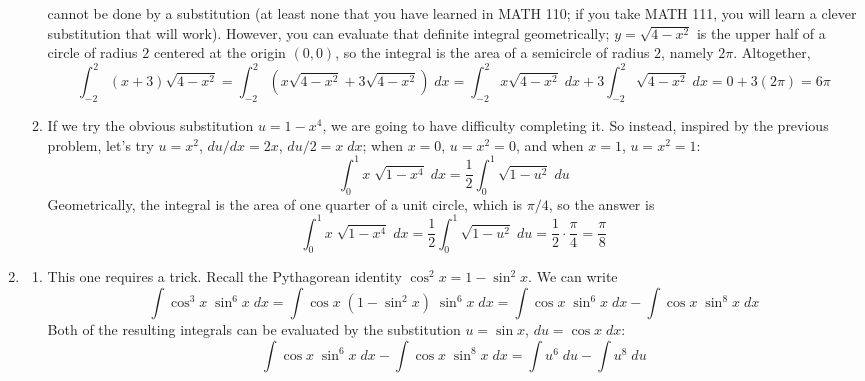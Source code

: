 \documentclass{article}
\begin{document}
\begin{enumerate}
\begin{enumerate}
\begin{equation*}
    \end{equation*}
    cannot be done by a substitution (at least none that you have
    learned in MATH 110; if you take MATH 111, you will learn a clever
    substitution that will work).  However, you can evaluate that
    definite integral geometrically; $y=\sqrt{4-x^2}$ is the upper
    half of a circle of radius $2$ centered at the origin $(0,0)$, so
    the integral is the area of a semicircle of radius $2$, namely
    $2\pi$.  %
    Altogether,
    \begin{equation*}
      \int_{-2}^2 (x+3) \sqrt{4-x^2}
      = \int_{-2}^2 \left( x\sqrt{4-x^2} + 3 \sqrt{4-x^2} \right) \;
      dx
      = \int_{-2}^2 x\sqrt{4-x^2} \; dx + 3 \int_{-2}^2 \sqrt{4-x^2}
      \; dx
      = 0 + 3(2\pi) = 6\pi
    \end{equation*}
  \item If we try the obvious substitution $u=1-x^4$, we are going to
    have difficulty completing it.  So instead, inspired by the
    previous problem, let's try $u=x^2$, $du/dx = 2x$, $du/2 = x \;
    dx$; when $x=0$, $u=x^2=0$, and when $x=1$, $u=x^2=1$:
    \begin{equation*}
      \int_0^1 x \; \sqrt{1-x^4} \; dx
      = \frac{1}{2} \int_{0}^{1} \sqrt{1-u^2} \; du
    \end{equation*}
    Geometrically, the integral is the area of one quarter of a unit
    circle, which is $\pi/4$, so the answer is
    \begin{equation*}
      \int_0^1 x \; \sqrt{1-x^4} \; dx
      = \frac{1}{2} \int_{0}^{1} \sqrt{1-u^2} \; du
      = \frac{1}{2} \cdot \frac{\pi}{4}
      = \frac{\pi}{8}
    \end{equation*}
  \end{enumerate}
\item
  \begin{enumerate}
  \item This one requires a trick.  Recall the Pythagorean identity
    $\cos^2 x = 1-\sin^2 x$.  We can write
    \begin{equation*}
      \int \cos^3 x \; \sin^6 x \; dx
      = \int \cos x \; (1-\sin^2 x) \; \sin^6 x \; dx
      = \int \cos x \; \sin^6 x \; dx  - \int \cos x \; \sin^8 x \; dx
    \end{equation*}
    Both of the resulting integrals can be evaluated by the
    substitution $u=\sin x$, $du = \cos x \; dx$:
    \begin{equation*}
      \int \cos x \; \sin^6 x \; dx - \int\cos x \; \sin^8 x \; dx
      = \int u^6 \; du - \int u^8 \; du

\end{equation*}
\end{enumerate}
\end{enumerate}
\end{document}
